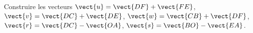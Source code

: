 
\begin{exercice}\label{exosmath-0592}

    \begin{center}
   
    \end{center}

    Construire les vecteurs \( \vect{ u }=\vect{ DF }+\vect{ FE }\), \( \vect{ v }=\vect{ DC }+\vect{ DE }\), \( \vect{ w }=\vect{ CB }+\vect{ DF }\), \( \vect{ r }=\vect{ DC }-\vect{ OA }\), \( \vect{ s }=\vect{ BO }-\vect{ EA }\).

\end{exercice}
